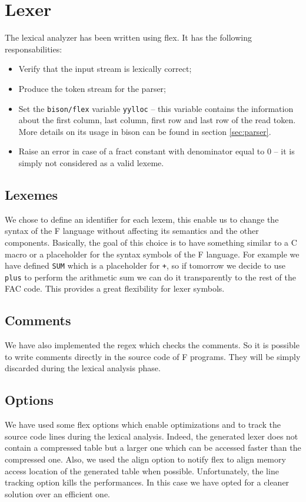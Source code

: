 \section{Lexer}
The lexical analyzer has been written using flex.
It has the following responsabilities:
\begin{itemize}
\item Verify that the input stream is lexically correct;
\item Produce the token stream for the parser;
\item Set the \verb|bison/flex| variable \verb|yylloc| -- this
variable contains the information about the first column, last column,
first row and last row of the read token. More details on its usage in
bison can be found in section \ref{sec:parser}.
\item Raise an error in case of a fract constant with denominator equal
to $0$ -- it is simply not considered as a valid lexeme.
\end{itemize}

\subsection{Lexemes}
We chose to define an identifier for each lexem, this enable us to change the
syntax of the F language without affecting its semantics and the other
components. Basically, the goal of this choice is to have something similar to
a C macro or a placeholder for the syntax symbols of the F language.
For example we have defined \verb|SUM| which is a placeholder for \verb|+|, so
if tomorrow we decide to use \verb|plus| to perform the arithmetic sum we can do
it transparently to the rest of the FAC code. This provides a great flexibility
for lexer symbols.

\subsection{Comments}
We have also implemented the regex which checks the comments. So it is possible
to write comments directly in the source code of F programs. They will be simply
 discarded during the lexical analysis phase.

\subsection{Options}
We have used some flex options which enable optimizations
and to track the source code lines during the lexical analysis. Indeed, the
generated lexer does not contain a compressed table but a larger one which can
be accessed faster than the compressed one. Also, we used the align option to
notify flex to align memory access location of the generated table when
possible. Unfortunately, the line tracking option kills the performances.
In this case we have opted for a cleaner solution over an efficient one.

